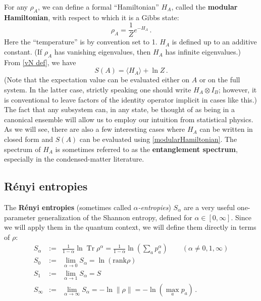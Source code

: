\documentclass[11pt]{article}
\newcommand{\ev}[1]{\langle{#1}\rangle}
\DeclareMathOperator{\Tr}{Tr}
\begin{document}
For any $\rho_A$, we can define a formal ``Hamiltonian'' $H_A$, called the \textbf{modular Hamiltonian}, with respect to which it is a Gibbs state:
\begin{equation}\label{modHamdef}
\rho_A = \frac1Ze^{-H_A}\,.
\end{equation}
Here the ``temperature'' is by convention set to 1. $H_A$ is defined up to an additive constant. (If $\rho_A$ has vanishing eigenvalues, then $H_A$ has infinite eigenvalues.) From \eqref{vN def}, we have
\begin{equation}\label{modularHamiltonian}
S(A) = \ev{H_A}+\ln Z\,.
\end{equation}
(Note that the expectation value can be evaluated either on $A$ or on the full system. In the latter case, strictly speaking one should write $H_A\otimes I_B$; however, it is conventional to leave factors of the identity operator implicit in cases like this.) The fact that any subsystem can, in any state, be thought of as being in a canonical ensemble will allow us to employ our intuition from statistical physics. As we will see, there are also a few interesting cases where $H_A$ can be written in closed form and $S(A)$ can be evaluated using \eqref{modularHamiltonian}. The spectrum of $H_A$ is sometimes referred to as the \textbf{entanglement spectrum}, especially in the condensed-matter literature.




\subsection{R\'enyi entropies}
\label{sec:Renyis}

The \textbf{R\'enyi entropies} (sometimes called \emph{$\alpha$-entropies}) $S_\alpha$ are a very useful one-parameter generalization of the Shannon entropy, defined for $\alpha\in[0,\infty]$. Since we will apply them in the quantum context, we will define them directly in terms of $\rho$:
\begin{eqnarray}
S_\alpha &:=& \frac1{1-\alpha}\ln\Tr\rho^\alpha=\frac1{1-\alpha}\ln\left(\sum_ap_a^\alpha\right) \qquad(\alpha\neq0,1,\infty) \\
S_0&:=&\lim_{\alpha\to0}S_\alpha = \ln(\text{rank}\rho) \\
S_1&:=&\lim_{\alpha\to1}S_\alpha = S \\
S_\infty&:=&\lim_{\alpha\to\infty}S_\alpha = -\ln\|\rho\| = -\ln(\max_ap_a)\,.
\end{eqnarray}
\end{document}
